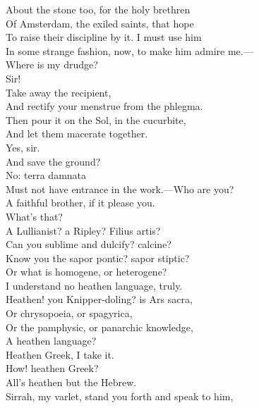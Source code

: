 \documentclass[a4paper,oneside]{memoir}
\begin{document}
\begin{drama*}
About the stone too, for the holy brethren\\
Of Amsterdam, the exiled saints, that hope\\
To raise their discipline by it. I must use him\\
In some strange fashion, now, to make him admire me.---\\
Where is my drudge?\\
\facespeaks {} Sir!\\
\subtlespeaks {} Take away the recipient,\\
And rectify your menstrue from the phlegma.\\
Then pour it on the Sol, in the cucurbite,\\
And let them macerate together.\\
\facespeaks Yes, sir.\\
And save the ground?\\
\subtlespeaks {} No: terra damnata\\
Must not have entrance in the work.---Who are you?\\
\ananiasspeaks A faithful brother, if it please you.\\
\subtlespeaks {} What's that?\\
A Lullianist? a Ripley? Filius artis?\\
Can you sublime and dulcify? calcine?\\
Know you the sapor pontic? sapor stiptic?\\
Or what is homogene, or heterogene?\\
\ananiasspeaks I understand no heathen language, truly.\\
\subtlespeaks Heathen! you Knipper-doling? is Ars sacra,\\
Or chrysopoeia, or spagyrica,\\
Or the pamphysic, or panarchic knowledge,\\
A heathen language?\\
\ananiasspeaks {} Heathen Greek, I take it.\\
\subtlespeaks How! heathen Greek?\\
\ananiasspeaks {} All's heathen but the Hebrew.\\
\subtlespeaks Sirrah, my varlet, stand you forth and speak to him,\\

\end{drama*}
\end{document}
